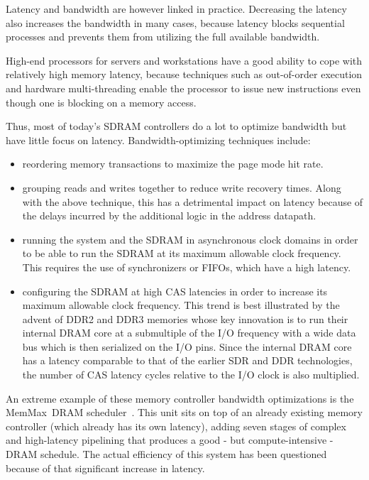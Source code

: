 \documentclass[a4paper,11pt]{kthesis}
\begin{document}
Latency and bandwidth are however linked in practice. Decreasing the latency also increases the bandwidth in many cases, because latency blocks sequential processes and prevents them from utilizing the full available bandwidth.

High-end processors for servers and workstations have a good ability to cope with relatively high memory latency, because techniques such as out-of-order execution and hardware multi-threading enable the processor to issue new instructions even though one is blocking on a memory access.

Thus, most of today's SDRAM controllers do a lot to optimize bandwidth but have little focus on latency. Bandwidth-optimizing techniques include:
\begin{itemize}
\item reordering memory transactions to maximize the page mode hit rate.
\item grouping reads and writes together to reduce write recovery times. Along with the above technique, this has a detrimental impact on latency because of the delays incurred by the additional logic in the address datapath.
\item running the system and the SDRAM in asynchronous clock domains in order to be able to run the SDRAM at its maximum allowable clock frequency. This requires the use of synchronizers or FIFOs, which have a high latency.
\item configuring the SDRAM at high CAS latencies in order to increase its maximum allowable clock frequency. This trend is best illustrated by the advent of DDR2 and DDR3 memories whose key innovation is to run their internal DRAM core at a submultiple of the I/O frequency with a wide data bus which is then serialized on the I/O pins. Since the internal DRAM core has a latency comparable to that of the earlier SDR and DDR technologies, the number of CAS latency cycles relative to the I/O clock is also multiplied.
\end{itemize}

An extreme example of these memory controller bandwidth optimizations is the MemMax\textregistered ~DRAM scheduler~\cite{memmax}. This unit sits on top of an already existing memory controller (which already has its own latency), adding seven stages of complex and high-latency pipelining that produces a good - but compute-intensive - DRAM schedule. The actual efficiency of this system has been questioned~\cite{dramqos} because of that significant increase in latency.
\end{document}
